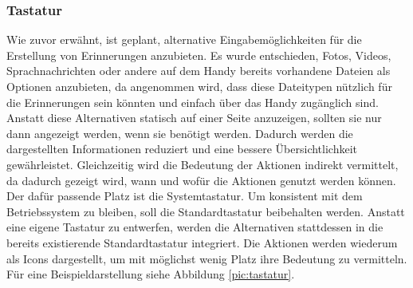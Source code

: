 \subsubsection{Tastatur}%
Wie zuvor erwähnt, ist geplant, alternative Eingabemöglichkeiten für die Erstellung von Erinnerungen anzubieten. Es wurde entschieden, Fotos, Videos, Sprachnachrichten oder andere auf dem Handy bereits vorhandene Dateien als Optionen anzubieten, da angenommen wird, dass diese Dateitypen nützlich für die Erinnerungen sein könnten und einfach über das Handy zugänglich sind.\newline%
Anstatt diese Alternativen statisch auf einer Seite anzuzeigen, sollten sie nur dann angezeigt werden, wenn sie benötigt werden. Dadurch werden die dargestellten Informationen reduziert und eine bessere Übersichtlichkeit gewährleistet. Gleichzeitig wird die Bedeutung der Aktionen indirekt vermittelt, da dadurch gezeigt wird, wann und wofür die Aktionen genutzt werden können. Der dafür passende Platz ist die Systemtastatur.\newline%
Um konsistent mit dem Betriebssystem zu bleiben, soll die Standardtastatur beibehalten werden. Anstatt eine eigene Tastatur zu entwerfen, werden die Alternativen stattdessen in die bereits existierende Standardtastatur integriert.\newline%
Die Aktionen werden wiederum als Icons dargestellt, um mit möglichst wenig Platz ihre Bedeutung zu vermitteln. 
\newline%
Für eine Beispieldarstellung siehe Abbildung \ref{pic:tastatur}.
